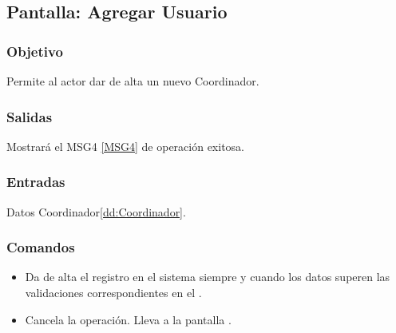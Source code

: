 \subsection{Pantalla: Agregar Usuario}

\subsubsection{Objetivo}
Permite al actor dar de alta un nuevo Coordinador.


\subsubsection{Salidas}
Mostrará el MSG4 \ref{MSG4} de operación exitosa.

\subsubsection{Entradas}
Datos Coordinador\ref{dd:Coordinador}.

\subsubsection{Comandos}
\begin{itemize}
 \item {} Da de alta el registro en el sistema siempre y cuando los datos superen las validaciones correspondientes en el .
 \item {} Cancela la operación. Lleva a la pantalla .
\end{itemize}

